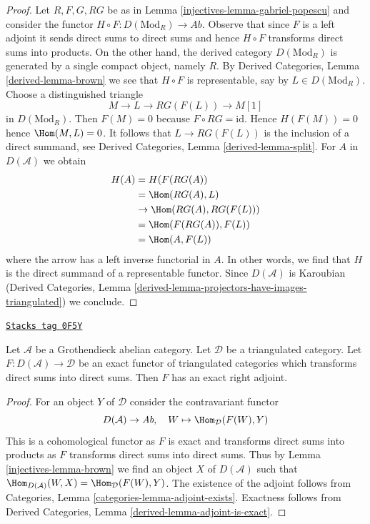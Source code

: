 \begin{proof}

Let $R, F, G, RG$ be as in Lemma \ref{injectives-lemma-gabriel-popescu}
and consider the functor $H \circ F : D(\text{Mod}_R) \to \textit{Ab}$.
Observe that since $F$ is a left adjoint it sends direct sums to
direct sums and hence $H \circ F$ transforms direct sums into products.
On the other hand, the derived category $D(\text{Mod}_R)$ is
generated by a single compact object, namely $R$.
By Derived Categories, Lemma \ref{derived-lemma-brown}
we see that $H \circ F$ is representable, say by $L \in D(\text{Mod}_R)$.
Choose a distinguished triangle
$$
M \to L \to RG(F(L)) \to M[1]
$$
in $D(\text{Mod}_R)$. Then $F(M) = 0$ because $F \circ RG = \text{id}$.
Hence $H(F(M)) = 0$ hence $\Hom(M, L) = 0$.
It follows that $L \to RG(F(L))$ is the inclusion of a direct summand, see
Derived Categories, Lemma \ref{derived-lemma-split}.
For $A$ in $D(\mathcal{A})$ we obtain
\begin{align*}
H(A)
& =
H(F(RG(A)) \\
& =
\Hom(RG(A), L) \\
& \to
\Hom(RG(A), RG(F(L))) \\
& =
\Hom(F(RG(A)), F(L)) \\
& =
\Hom(A, F(L))
\end{align*}
where the arrow has a left inverse functorial in $A$. In other words, we find
that $H$ is the direct summand of a representable functor.
Since $D(\mathcal{A})$ is Karoubian
(Derived Categories, Lemma
\ref{derived-lemma-projectors-have-images-triangulated}) we conclude.
\end{proof}

\begin{proposition}[Brown]
\label{injectives-proposition-brown}
\href{https://stacks.math.columbia.edu/tag/0F5Y}{\texttt{Stacks tag 0F5Y}}

Let $\mathcal{A}$ be a Grothendieck abelian category. Let $\mathcal{D}$
be a triangulated category. Let $F : D(\mathcal{A}) \to \mathcal{D}$ be an
exact functor of triangulated categories which transforms direct sums
into direct sums. Then $F$ has an exact right adjoint.
\end{proposition}

\begin{proof}

For an object $Y$ of $\mathcal{D}$ consider the contravariant functor
$$
D(\mathcal{A}) \to \textit{Ab},\quad
W \mapsto \Hom_\mathcal{D}(F(W), Y)
$$
This is a cohomological functor as $F$ is exact and transforms direct sums
into products as $F$ transforms direct sums into direct sums. Thus by
Lemma \ref{injectives-lemma-brown} we find an object $X$ of $D(\mathcal{A})$ such that
$\Hom_{D(\mathcal{A})}(W, X) = \Hom_\mathcal{D}(F(W), Y)$.
The existence of the adjoint follows from
Categories, Lemma \ref{categories-lemma-adjoint-exists}.
Exactness follows from
Derived Categories, Lemma \ref{derived-lemma-adjoint-is-exact}.
\end{proof}



